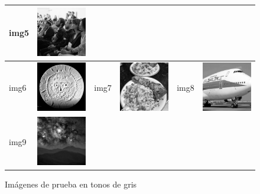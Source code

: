 \documentclass{article}
\begin{document}
\begin{figure}
\begin{center}
\begin{tabular}[t]{|ll|ll|ll|}
img5 & \includegraphics[width=4cm]{../imgs/input/imgs_gray/img05.png} \\
\hline
img6 & \includegraphics[width=4cm]{../imgs/input/imgs_gray/img06.png} &
img7 & \includegraphics[width=4cm]{../imgs/input/imgs_gray/img07.png} &
img8 & \includegraphics[width=4cm]{../imgs/input/imgs_gray/img08.png} \\
\hline
img9 & \includegraphics[width=4cm]{../imgs/input/imgs_gray/img09.png} &&&& \\
\hline
\end{tabular}
\end{center}
\caption{Imágenes de prueba en tonos de gris}
\label{fig:imagenes_de_prueba_gris}
\end{figure}
\end{document}
